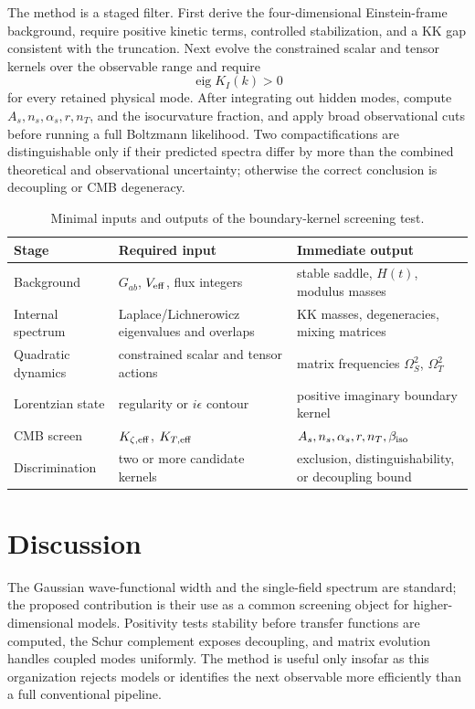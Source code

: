 \documentclass[11pt,a4paper]{article}
\begin{document}
The method is a staged filter. First derive the four-dimensional Einstein-frame background, require positive kinetic terms, controlled stabilization, and a KK gap consistent with the truncation. Next evolve the constrained scalar and tensor kernels over the observable range and require
\begin{equation}
\operatorname{eig}K_I(k)>0
\end{equation}
for every retained physical mode. After integrating out hidden modes, compute $A_s,n_s,\alpha_s,r,n_T$, and the isocurvature fraction, and apply broad observational cuts before running a full Boltzmann likelihood. Two compactifications are distinguishable only if their predicted spectra differ by more than the combined theoretical and observational uncertainty; otherwise the correct conclusion is decoupling or CMB degeneracy.

\begin{table}[tbp]
\caption{Minimal inputs and outputs of the boundary-kernel screening test.}
\begin{tabular}{lll}
Stage & Required input & Immediate output\\
\hline
Background & $G_{ab}$, $V_{\rm eff}$, flux integers & stable saddle, $H(t)$, modulus masses\\
Internal spectrum & Laplace/Lichnerowicz eigenvalues and overlaps & KK masses, degeneracies, mixing matrices\\
Quadratic dynamics & constrained scalar and tensor actions & matrix frequencies $\Omega_S^2$, $\Omega_T^2$\\
Lorentzian state & regularity or $i\epsilon$ contour & positive imaginary boundary kernel\\
CMB screen & $K_{\zeta,\rm eff}$, $K_{T,\rm eff}$ & $A_s,n_s,\alpha_s,r,n_T,\beta_{\rm iso}$\\
Discrimination & two or more candidate kernels & exclusion, distinguishability, or decoupling bound\\
\end{tabular}
\end{table}

\section{Discussion}
\label{sec:discussion}

The Gaussian wave-functional width and the single-field spectrum are standard; the proposed contribution is their use as a common screening object for higher-dimensional models. Positivity tests stability before transfer functions are computed, the Schur complement exposes decoupling, and matrix evolution handles coupled modes uniformly. The method is useful only insofar as this organization rejects models or identifies the next observable more efficiently than a full conventional pipeline.
\end{document}
